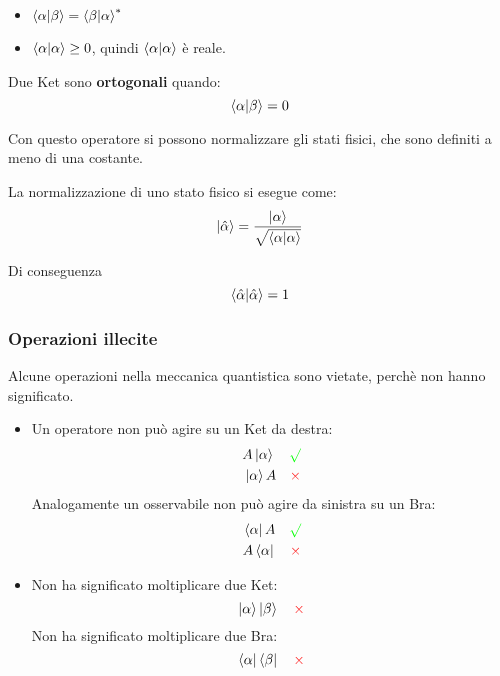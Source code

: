 \documentclass[a4paper]{article}
\begin{document}
\begin{itemize}
  \item \( \braket{\alpha}{\beta} = \braket{\beta}{\alpha}^* \) 
  \item \( \braket{\alpha}{\alpha} \geq 0 \), quindi \( \braket{\alpha}{\alpha} \) è reale.
\end{itemize}

\begin{definition}
  Due Ket sono \textbf{ortogonali} quando:
  \[
    \braket{\alpha}{\beta} = 0
  \] 
\end{definition}

\vspace{3em}
\noindent
Con questo operatore si possono normalizzare gli stati fisici, che sono definiti a meno di
una costante.
\begin{definition}[Normalizzazione]
  La normalizzazione di uno stato fisico si esegue come:
  \[
    \ket{\hat{\alpha}} = \frac{\ket{\alpha}}{\sqrt{\braket{\alpha}{\alpha}}}
  \] 

  \vspace{1em}
  \noindent
  Di conseguenza
  \[
    \braket{\hat{\alpha}}{\hat{\alpha}} = 1
  \] 
\end{definition}

\subsubsection{Operazioni illecite}
Alcune operazioni nella meccanica quantistica sono vietate, perchè non hanno significato.
\begin{itemize}
  \item Un operatore non può agire su un Ket da destra:
    \[
      \begin{aligned}
        A \ket{\alpha} \quad \color{green}\surd\\
        \ket{\alpha}A \quad \color{red}\times
      \end{aligned}
    \] 
    Analogamente un osservabile non può agire da sinistra su un Bra:
    \[
      \begin{aligned}
        \bra{\alpha}A \quad \color{green}\surd\\
        A\bra{\alpha} \quad \color{red}\times
      \end{aligned}
    \]

  \item Non ha significato moltiplicare due Ket:
    \[
      \ket{\alpha} \ket{\beta} \quad \color{red}\times
    \] 
    Non ha significato moltiplicare due Bra:
    \[
      \bra{\alpha} \bra{\beta} \quad \color{red}\times
    \] 
\end{itemize}
\end{document}
